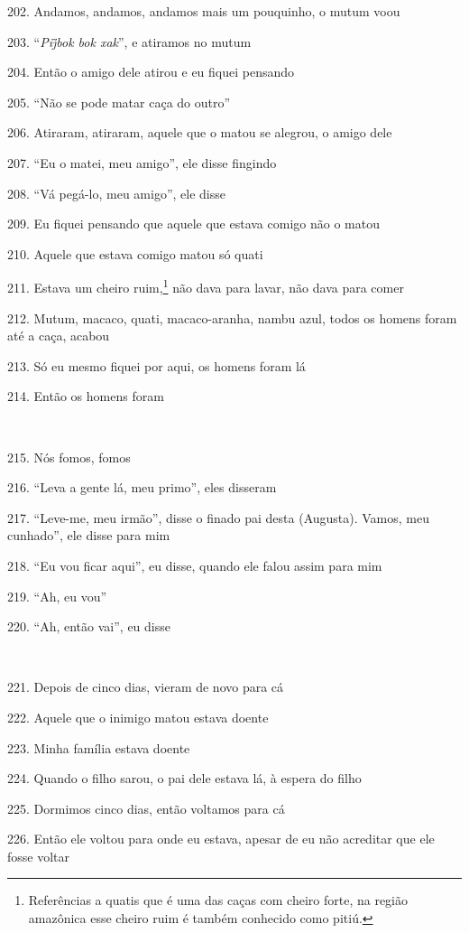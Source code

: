 202. Andamos, andamos, andamos mais um pouquinho, o mutum voou

203. ``\emph{Pij̃bok bok xak}'', e atiramos no mutum

204. Então o amigo dele atirou e eu fiquei pensando

205. ``Não se pode matar caça do outro''

206. Atiraram, atiraram, aquele que o matou se alegrou, o amigo dele

207. ``Eu o matei, meu amigo'', ele disse fingindo

208. ``Vá pegá-lo, meu amigo'', ele disse

209. Eu fiquei pensando que aquele que estava comigo não o matou

210. Aquele que estava comigo matou só quati

211. Estava um cheiro ruim,\footnote{Referências a quatis que é uma das
  caças com cheiro forte, na região amazônica esse cheiro ruim é também
  conhecido como pitiú.} não dava para lavar, não dava para comer

212. Mutum, macaco, quati, macaco-aranha, nambu azul, todos os homens
foram até a caça, acabou

213. Só eu mesmo fiquei por aqui, os homens foram lá

214. Então os homens foram

~

215. Nós fomos, fomos

216. ``Leva a gente lá, meu primo'', eles disseram

217. ``Leve-me, meu irmão'', disse o finado pai desta (Augusta).  Vamos,
meu cunhado'', ele disse para mim

218. ``Eu vou ficar aqui'', eu disse, quando ele falou assim para mim

219. ``Ah, eu vou''

220. ``Ah, então vai'', eu disse

~

221. Depois de cinco dias, vieram de novo para cá

222. Aquele que o inimigo matou estava doente

223. Minha família estava doente

224. Quando o filho sarou, o pai dele estava lá, à espera do filho

225. Dormimos cinco dias, então voltamos para cá

226. Então ele voltou para onde eu estava, apesar de eu não acreditar que
ele fosse voltar

